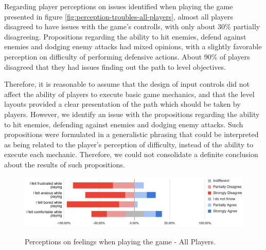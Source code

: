 Regarding player perceptions on issues identified when playing the game presented in figure \ref{fig:perception-troubles-all-players}, almost all players disagreed to have issues with the game's controlls, with only about 30\% partially disagreeing. Propositions regarding the ability to hit enemies, defend against enemies and dodging enemy attacks had mixed opinions, with a slightly favorable perception on difficulty of performing defensive actions. About 90\% of players disagreed that they had issues finding out the path to level objectives.

Therefore, it is reasonable to assume that the design of input controls did not affect the ability of players to execute basic game mechanics, and that the level layouts provided a clear presentation of the path which should be taken by players. However, we identify an issue with the propositions regarding the ability to hit enemies, defending against enemies and dodging enemy attacks. Such propositions were formulated in a generalistic phrasing that could be interpreted as being related to the player's perception of difficulty, instead of the ability to execute each mechanic. Therefore, we could not consolidate a definite conclusion about the results of such propositions.

\begin{figure}[!ht]
    \begin{center}
    \caption{Perceptions on feelings when playing the game - All Players.}
        \includegraphics[width=36em]{figures/fig-perception-feelings-all-players.png}
        \label{fig:perception-feelings-all-players}
    \end{center}
\end{figure}

